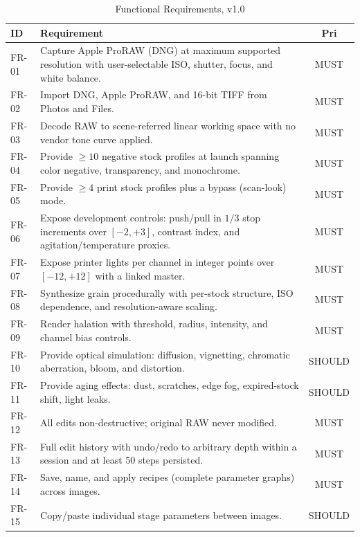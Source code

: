\begin{table}[htbp]
\caption{Functional Requirements, v1.0}
\label{tab:fr}
\begin{center}
\renewcommand{\arraystretch}{1.12}
\begin{tabularx}{\columnwidth}{@{}l>{\raggedright\arraybackslash}X c@{}}
\toprule
\textbf{ID} & \textbf{Requirement} & \textbf{Pri} \\
\midrule
FR-01 & Capture Apple ProRAW (DNG) at maximum supported resolution with user-selectable ISO, shutter, focus, and white balance. & MUST \\
FR-02 & Import DNG, Apple ProRAW, and 16-bit TIFF from Photos and Files. & MUST \\
FR-03 & Decode RAW to scene-referred linear working space with no vendor tone curve applied. & MUST \\
FR-04 & Provide $\geq 10$ negative stock profiles at launch spanning color negative, transparency, and monochrome. & MUST \\
FR-05 & Provide $\geq 4$ print stock profiles plus a bypass (scan-look) mode. & MUST \\
FR-06 & Expose development controls: push/pull in $1/3$ stop increments over $[-2,+3]$, contrast index, and agitation/temperature proxies. & MUST \\
FR-07 & Expose printer lights per channel in integer points over $[-12,+12]$ with a linked master. & MUST \\
FR-08 & Synthesize grain procedurally with per-stock structure, ISO dependence, and resolution-aware scaling. & MUST \\
FR-09 & Render halation with threshold, radius, intensity, and channel bias controls. & MUST \\
FR-10 & Provide optical simulation: diffusion, vignetting, chromatic aberration, bloom, and distortion. & SHOULD \\
FR-11 & Provide aging effects: dust, scratches, edge fog, expired-stock shift, light leaks. & SHOULD \\
FR-12 & All edits non-destructive; original RAW never modified. & MUST \\
FR-13 & Full edit history with undo/redo to arbitrary depth within a session and at least 50 steps persisted. & MUST \\
FR-14 & Save, name, and apply recipes (complete parameter graphs) across images. & MUST \\
FR-15 & Copy/paste individual stage parameters between images. & SHOULD \\

\end{tabularx}
\end{center}
\end{table}

